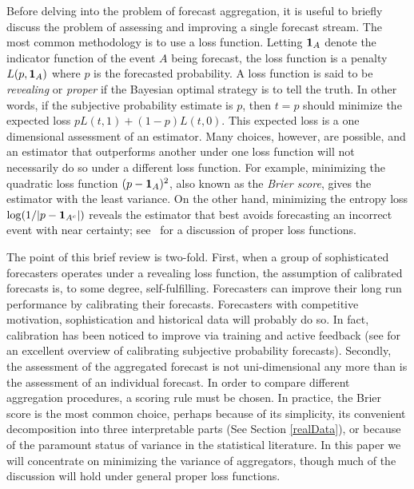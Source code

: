 \documentclass[11pt]{article}
\theoremstyle{definition}
\theoremstyle{definition}
\def\one{{\bf 1}}
\begin{document}
Before delving into the problem of forecast aggregation, it is useful
to briefly discuss the problem of assessing and improving a single
forecast stream.  The most common methodology is to use a loss
function.  Letting $\one_A$ denote the indicator function of the event
$A$ being forecast, the loss function is a penalty $L(p , \one_A)$
where $p$ is the forecasted probability.  A loss function is said to
be {\em revealing} or {\em proper} if the Bayesian optimal strategy is
to tell the truth.  In other words, if the subjective probability
estimate is $p$, then $t = p$ should minimize the expected loss $p
L(t,1) + (1-p) L(t,0)$.  This expected loss is a one dimensional
assessment of an estimator. Many choices, however, are possible, and
an estimator that outperforms another under one loss function will not
necessarily do so under a different loss function.  For example,
minimizing the quadratic loss function $(p - \one_A)^2$, also known as
the {\em Brier score}, gives the estimator with the least variance. On
the other hand, minimizing the entropy loss $\log (1 / |p -
\one_{A^c}|)$ reveals the estimator that best avoids forecasting an
incorrect event with near certainty; see~\citet[Section~2]{HwPe1997}
for a discussion of proper loss functions.

The point of this brief review is two-fold.  First, when a group of
sophisticated forecasters operates under a revealing loss function,
the assumption of calibrated forecasts is, to some degree,
self-fulfilling.  Forecasters can improve their long run performance
by calibrating their forecasts. Forecasters with competitive
motivation, sophistication and historical data will probably do so. In
fact, calibration has been noticed to improve via training and active
feedback (see \citealt{o2006uncertain} for an excellent overview of
calibrating subjective probability forecasts). Secondly, the
assessment of the aggregated forecast is not uni-dimensional any more
than is the assessment of an individual forecast.  In order to compare
different aggregation procedures, a scoring rule must be chosen.  In
practice, the Brier score is the most common choice, perhaps because
of its simplicity, its convenient decomposition into three
interpretable parts (See Section \ref{realData}), or because of the
paramount status of variance in the statistical literature.  In this
paper we will concentrate on minimizing the variance of aggregators,
though much of the discussion will hold under general proper loss
functions.
\end{document}
